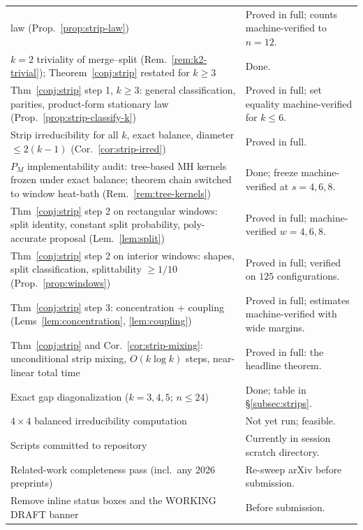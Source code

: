 \documentclass[11pt]{article}
\begin{document}
\begin{center}
\begin{tabular}{p{7.6cm} p{6.8cm}}
law (Prop.~\ref{prop:strip-law}) &
  \textcolor{donecol}{Proved in full; counts machine-verified to
  $n = 12$.} \\
$k = 2$ triviality of merge--split (Rem.~\ref{rem:k2-trivial});
Theorem~\ref{conj:strip} restated for $k \ge 3$ &
  \textcolor{donecol}{Done.} \\
Thm~\ref{conj:strip} step 1, $k \ge 3$: general classification,
parities, product-form stationary law
(Prop.~\ref{prop:strip-classify-k}) &
  \textcolor{donecol}{Proved in full; set equality machine-verified for
  $k \le 6$.} \\
Strip irreducibility for all $k$, exact balance, diameter $\le 2(k-1)$
(Cor.~\ref{cor:strip-irred}) &
  \textcolor{donecol}{Proved in full.} \\
$P_M$ implementability audit: tree-based MH kernels frozen under
exact balance; theorem chain switched to window heat-bath
(Rem.~\ref{rem:tree-kernels}) &
  \textcolor{donecol}{Done; freeze machine-verified at $s = 4, 6, 8$.} \\
Thm~\ref{conj:strip} step 2 on rectangular windows: split identity,
constant split probability, $\mathrm{poly}$-accurate proposal
(Lem.~\ref{lem:split}) &
  \textcolor{donecol}{Proved in full; machine-verified $w = 4, 6, 8$.} \\
Thm~\ref{conj:strip} step 2 on interior windows: shapes, split
classification, splittability $\ge 1/10$
(Prop.~\ref{prop:windows}) &
  \textcolor{donecol}{Proved in full; verified on $125$
  configurations.} \\
Thm~\ref{conj:strip} step 3: concentration + coupling
(Lems~\ref{lem:concentration}, \ref{lem:coupling}) &
  \textcolor{donecol}{Proved in full; estimates machine-verified with
  wide margins.} \\
Thm~\ref{conj:strip} and Cor.~\ref{cor:strip-mixing}: unconditional
strip mixing, $O(k \log k)$ steps, near-linear total time &
  \textcolor{donecol}{Proved in full: the headline theorem.} \\
Exact gap diagonalization ($k = 3, 4, 5$; $n \le 24$) &
  \textcolor{donecol}{Done; table in \S\ref{subsec:strips}.} \\
$4 \times 4$ balanced irreducibility computation &
  \textcolor{misscol}{Not yet run; feasible.} \\
Scripts committed to repository &
  \textcolor{misscol}{Currently in session scratch directory.} \\
Related-work completeness pass (incl.\ any 2026 preprints) &
  \textcolor{misscol}{Re-sweep arXiv before submission.} \\
Remove inline status boxes and the WORKING DRAFT banner &
  \textcolor{misscol}{Before submission.} \\
\hline
\end{tabular}
\end{center}
\end{document}
